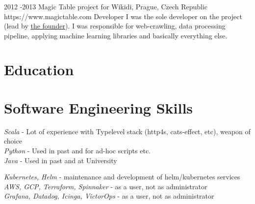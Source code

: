 \documentclass[10pt]{article} %
\begin{document}

    \job
    {2012 -}{2013}
    {Magic Table project for Wikidi, Prague, Czech Republic}
    {https://www.magictable.com}
    {Developer}
    {I was the sole developer on the project (lead by \href{https://michal.illich.cz/}{the founder}). I was responsible for web-crawling, data processing pipeline, applying machine learning libraries and basically everything else. \\
    }




    \section{Education}




    \section{Software Engineering Skills}

    {
        \textit{Scala} - Lot of experience with Typelevel stack (http4s, cats-effect, etc), weapon of choice\\
    \textit{Python} - Used in past and for ad-hoc scripts etc.\\
    \textit{Java} - Used in past and at University\\
    }


    {
        \textit{Kubernetes, Helm} - maintenance and development of helm/kubernetes services\\
        \textit{AWS, GCP, Terraform, Spinnaker} - as a user, not as administrator \\
    \textit{Grafana, Datadog, Icinga, VictorOps} - as a user, not as administrator \\
    }
\end{document}
